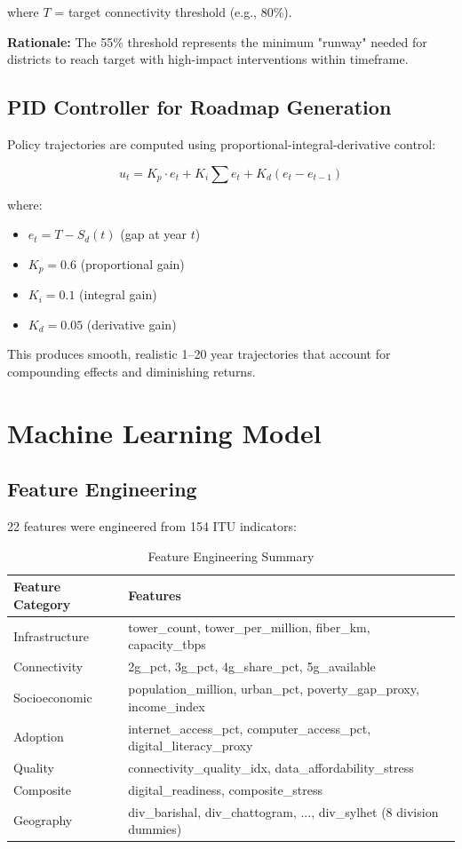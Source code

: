 \documentclass[11pt,a4paper]{article}
\begin{document}
where $T$ = target connectivity threshold (e.g., 80\%).

\textbf{Rationale:} The 55\% threshold represents the minimum "runway" needed for districts to reach target with high-impact interventions within timeframe.

\subsection{PID Controller for Roadmap Generation}

Policy trajectories are computed using proportional-integral-derivative control:

$$u_t = K_p \cdot e_t + K_i \sum e_t + K_d (e_t - e_{t-1})$$

where:
\begin{itemize}
  \item $e_t = T - S_d(t)$ (gap at year $t$)
  \item $K_p = 0.6$ (proportional gain)
  \item $K_i = 0.1$ (integral gain)
  \item $K_d = 0.05$ (derivative gain)
\end{itemize}

This produces smooth, realistic 1–20 year trajectories that account for compounding effects and diminishing returns.

\section{Machine Learning Model}

\subsection{Feature Engineering}

22 features were engineered from 154 ITU indicators:

\begin{table}[h]
\centering
\caption{Feature Engineering Summary}
\small
\begin{tabular}{|l|l|}
\hline
\textbf{Feature Category} & \textbf{Features} \\
\hline
Infrastructure & tower\_count, tower\_per\_million, fiber\_km, capacity\_tbps \\
\hline
Connectivity & 2g\_pct, 3g\_pct, 4g\_share\_pct, 5g\_available \\
\hline
Socioeconomic & population\_million, urban\_pct, poverty\_gap\_proxy, income\_index \\
\hline
Adoption & internet\_access\_pct, computer\_access\_pct, digital\_literacy\_proxy \\
\hline
Quality & connectivity\_quality\_idx, data\_affordability\_stress \\
\hline
Composite & digital\_readiness, composite\_stress \\
\hline
Geography & div\_barishal, div\_chattogram, ..., div\_sylhet (8 division dummies) \\
\hline
\end{tabular}
\end{table}
\end{document}
